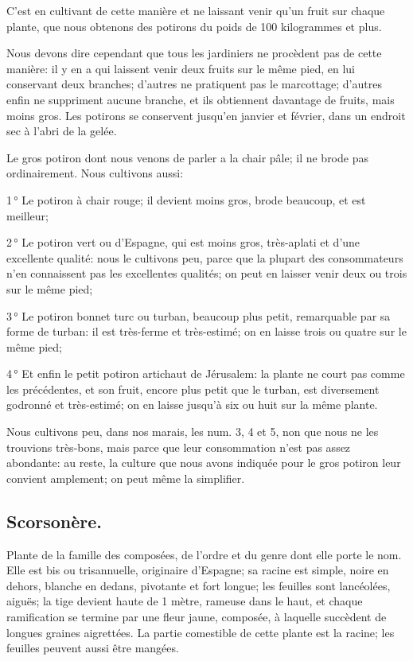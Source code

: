 \documentclass[10pt,a4paper]{book}
\begin{document}
C'est en cultivant de cette manière et ne laissant venir qu'un fruit sur chaque plante, que nous obtenons des potirons du poids de 100 kilogrammes et plus.

Nous devons dire cependant que tous les jardiniers ne procèdent pas de cette manière: il y en a qui laissent venir deux fruits sur le même pied, en lui conservant deux branches; d'autres ne pratiquent pas le marcottage; d'autres enfin ne suppriment aucune branche, et ils obtiennent davantage de fruits, mais moins gros. Les potirons se conservent jusqu'en janvier et février, dans un endroit sec à l'abri de la gelée.

Le gros potiron dont nous venons de parler a la chair pâle; il ne brode pas ordinairement. Nous cultivons aussi:

1\,° Le potiron à chair rouge; il devient moins gros, brode beaucoup, et est meilleur;

2\,° Le potiron vert ou d'Espagne, qui est moins gros, très-aplati et d'une excellente qualité: nous le cultivons peu, parce que la plupart des consommateurs n'en connaissent pas les excellentes qualités; on peut en laisser venir deux ou trois sur le même pied;

3\,° Le potiron bonnet turc ou turban, beaucoup plus petit, remarquable par sa forme de turban: il est très-ferme et très-estimé; on en laisse trois ou quatre sur le même pied;

4\,° Et enfin le petit potiron artichaut de Jérusalem: la plante ne court pas comme les précédentes, et son fruit, encore plus petit que le turban, est diversement godronné et très-estimé; on en laisse jusqu'à six ou huit sur la même plante.

Nous cultivons peu, dans nos marais, les num. 3, 4 et 5, non que nous ne les trouvions très-bons, mais parce que leur consommation n'est pas assez abondante: au reste, la culture que nous avons indiquée pour le gros potiron leur convient amplement; on peut même la simplifier.

\subsection{Scorsonère.}

Plante de la famille des composées, de l'ordre et du genre dont elle porte le nom. Elle est bis ou trisannuelle, originaire d'Espagne; sa racine est simple, noire en dehors, blanche en dedans, pivotante et fort longue; les feuilles sont lancéolées, aiguës; la tige devient haute de 1 mètre, rameuse dans le haut, et chaque ramification se termine par une fleur jaune, composée, à laquelle succèdent de longues graines aigrettées. La partie comestible de cette plante est la racine; les feuilles peuvent aussi être mangées.
\end{document}
